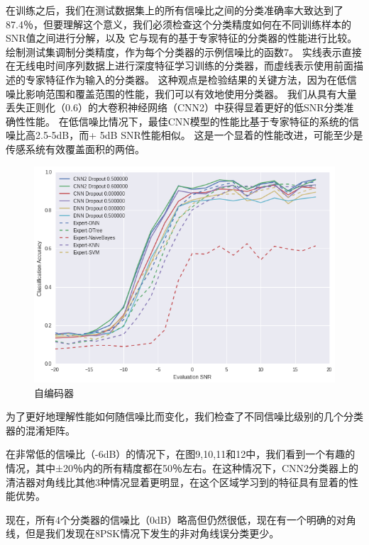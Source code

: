 在训练之后，我们在测试数据集上的所有信噪比之间的分类准确率大致达到了87.4％，但要理解这个意义，我们必须检查这个分类精度如何在不同训练样本的SNR值之间进行分解，以及 它与现有的基于专家特征的分类器的性能进行比较。绘制测试集调制分类精度，作为每个分类器的示例信噪比的函数7。 实线表示直接在无线电时间序列数据上进行深度特征学习训练的分类器，而虚线表示使用前面描述的专家特征作为输入的分类器。 这种观点是检验结果的关键方法，因为在低信噪比影响范围和覆盖范围的性能，我们可以有效地使用分类器。 我们从具有大量丢失正则化（0.6）的大卷积神经网络（CNN2）中获得显着更好的低SNR分类准确性性能。 在低信噪比情况下，最佳CNN模型的性能比基于专家特征的系统的信噪比高2.5-5dB，而+ 5dB SNR性能相似。 这是一个显着的性能改进，可能至少是传感系统有效覆盖面积的两倍。\par

\begin{figure}[!h]
	\centering
	\includegraphics[scale=0.3]{figures/chapter_3/result}
	\caption{自编码器}	\label{fig_3_2}
\end{figure}


为了更好地理解性能如何随信噪比而变化，我们检查了不同信噪比级别的几个分类器的混淆矩阵。\par

在非常低的信噪比（-6dB）的情况下，在图9,10,11和12中，我们看到一个有趣的情况，其中±20％内的所有精度都在50％左右。在这种情况下，CNN2分类器上的清洁器对角线比其他3种情况显着更明显，在这个区域学习到的特征具有显着的性能优势。\par

现在，所有4个分类器的信噪比（0dB）略高但仍然很低，现在有一个明确的对角线，但是我们发现在8PSK情况下发生的非对角线误分类更少。\par

